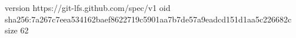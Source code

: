 version https://git-lfs.github.com/spec/v1
oid sha256:7a267c7eea534162baef8622719c5901aa7b7de57a9eadcd151d1aa5c226682c
size 62
